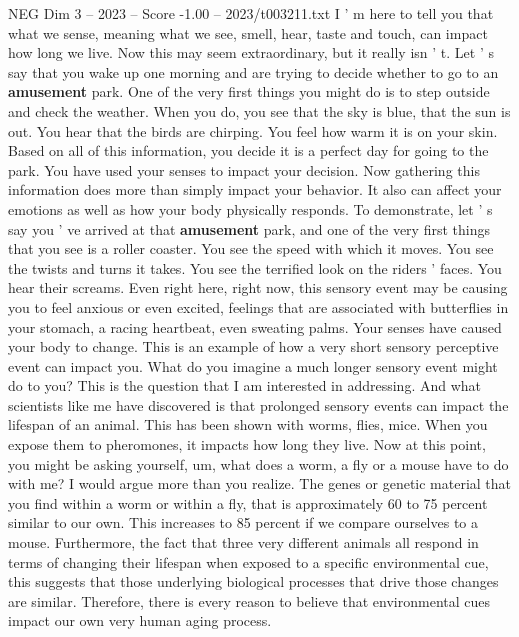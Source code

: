 \begin{textsample}{NEG Dim 3 – 2023 – Score -1.00 – 2023/t003211.txt}  \label{ex:f3_neg_043}
I ' m here to tell you that what we sense, meaning what we see, smell, hear, taste and touch, can impact how long we live.
Now this may seem extraordinary, but it really isn ' t.
Let ' s say that you wake up one morning and are trying to decide whether to go to an \textbf{amusement} park.
One of the very first things you might do is to step outside and check the weather.
When you do, you see that the sky is blue, that the sun is out.
You hear that the birds are chirping.
You feel how warm it is on your skin.
Based on all of this information, you decide it is a perfect day for going to the park.
You have used your senses to impact your decision.
Now gathering this information does more than simply impact your behavior.
It also can affect your emotions as well as how your body physically responds.
To demonstrate, let ' s say you ' ve arrived at that \textbf{amusement} park, and one of the very first things that you see is a roller coaster.
You see the speed with which it moves.
You see the twists and turns it takes.
You see the terrified look on the riders ' faces.
You hear their screams.
Even right here, right now, this sensory event may be causing you to feel anxious or even excited, feelings that are associated with butterflies in your stomach, a racing heartbeat, even sweating palms.
Your senses have caused your body to change.
This is an example of how a very short sensory perceptive event can impact you.
What do you imagine a much longer sensory event might do to you?
This is the question that I am interested in addressing.
And what scientists like me have discovered is that prolonged sensory events can impact the lifespan of an animal.
This has been shown with worms, flies, mice.
When you expose them to pheromones, it impacts how long they live.
Now at this point, you might be asking yourself, um, what does a worm, a fly or a mouse have to do with me?
I would argue more than you realize.
The genes or genetic material that you find within a worm or within a fly, that is approximately 60 to 75 percent similar to our own.
This increases to 85 percent if we compare ourselves to a mouse.
Furthermore, the fact that three very different animals all respond in terms of changing their lifespan when exposed to a specific environmental cue, this suggests that those underlying biological processes that drive those changes are similar.
Therefore, there is every reason to believe that environmental cues impact our own very human aging process.

\end{textsample}
